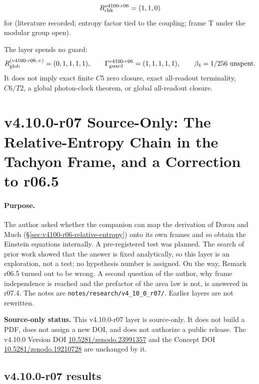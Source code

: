 \[
R_{\rm chk}^{v4100\text{-}r06}=(1,1,0)
\]
for (literature recorded; entropy factor tied to the coupling; frame T under the modular group open).

The layer spends no guard:
\[
R_{\rm glob}^{(v4100\text{-}r06,+)}=(0,1,1,1,1),
\qquad
\Gamma_{\rm guard}^{v4100\text{-}r06}=(1,1,1,1,1),
\qquad
\beta_4=1/256\ \text{unspent}.
\]
It does not imply exact finite \(C5\) zero closure, exact all-readout terminality,
\(C6/T2\), a global photon-clock theorem, or global all-readout closure.
\clearpage
\section*{v4.10.0-r07 Source-Only: The Relative-Entropy Chain in the Tachyon Frame, and a Correction to r06.5}
\label{sec:v4100-r07-tachyon-chain}

\paragraph{Purpose.}
The author asked whether the companion can map the derivation of Dorau and Much (\S\ref{sec:v4100-r06-relative-entropy}) onto its own frames and
so obtain the Einstein equations internally.  A pre-registered test was planned.  The search of prior work showed that the answer is fixed
analytically, so this layer is an exploration, not a test; no hypothesis number is assigned.  On the way, Remark r06.5 turned out to be wrong.  A second question of the author, why frame independence is reached and the prefactor of the area law is not, is answered in r07.4.
The notes are \texttt{notes/\allowbreak research/\allowbreak v4\_10\_0\_r07/}.  Earlier layers are not rewritten.

\noindent\textbf{Source-only status.}
This v4.10.0-r07 layer is source-only.  It does not build a PDF, does not assign a new DOI,
and does not authorize a public release.  The v4.10.0 Version DOI
\href{https://doi.org/10.5281/zenodo.23991357}{10.5281/zenodo.23991357} and the Concept DOI
\href{https://doi.org/10.5281/zenodo.19210728}{10.5281/zenodo.19210728} are unchanged by it.

\subsection*{v4.10.0-r07 results}
\label{subsec:v4100-r07-results}

